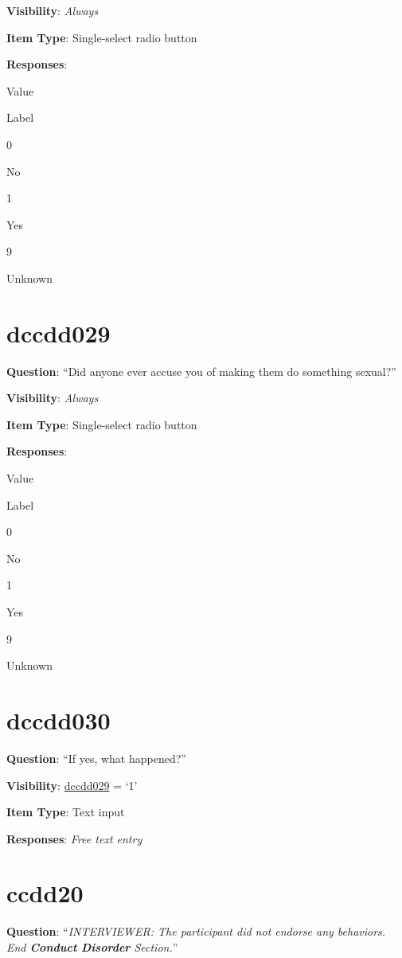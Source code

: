 \documentclass[]{book}
\begin{document}
\textbf{Visibility}: \emph{Always}

\textbf{Item Type}: Single-select radio button

\textbf{Responses}:

Value

Label

0

No

1

Yes

9

Unknown

\hypertarget{dccdd029}{%
\section{dccdd029}\label{dccdd029}}

\textbf{Question}: ``Did anyone ever accuse you of making them do something sexual?''

\textbf{Visibility}: \emph{Always}

\textbf{Item Type}: Single-select radio button

\textbf{Responses}:

Value

Label

0

No

1

Yes

9

Unknown

\hypertarget{dccdd030}{%
\section{dccdd030}\label{dccdd030}}

\textbf{Question}: ``If yes, what happened?''

\textbf{Visibility}: \protect\hyperlink{dccdd029}{dccdd029} = `1'

\textbf{Item Type}: Text input

\textbf{Responses}: \emph{Free text entry}

\hypertarget{ccdd20}{%
\section{ccdd20}\label{ccdd20}}

\textbf{Question}: ``\emph{INTERVIEWER: The participant did not endorse any behaviors. End \textbf{Conduct Disorder} Section.}''
\end{document}
